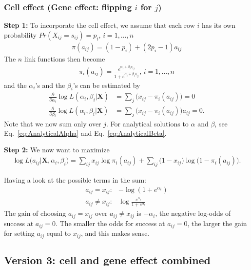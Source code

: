 \documentclass[12pt]{article}
\begin{document}
\subsubsection*{Cell effect {\small (Gene effect: flipping $i$ for $j$)}} %
{\bf Step 1:} To incorporate the cell effect, we assume that each row $i$ has its own probability  $Pr(X_{ij} = s_{ij}) = p_i, \, i = 1, \ldots , n$
\begin{align}
 \pi(a_{ij}) = (1 -  p_{i}) + (2  p_{i} - 1) a_{ij}
\end{align}
The $n$ link functions then become
\begin{align} \label{eq:LinkCell}
  \pi_i(a_{ij}) = \frac{e^{\alpha_{i} + \beta_{i} a_{ij}}}{1 + e^{\alpha_{i} + \beta_{i} a_{ij}}}, \, i = 1, \ldots, n
\end{align}
and the $\alpha_{i}$'s and the $\beta_{i}$'s can be estimated by
\begin{align}
  \frac{\partial}{\partial \alpha_i} \log L(\alpha_i, \beta_i|\mathbf{X}) &= \sum_{j} \big (x_{ij} -\pi_i(a_{ij}) \big ) = 0  \label{eq:iAlpha} \\
  \frac{\partial}{\partial \beta_i} \log L(\alpha_i, \beta_i|\mathbf{X}) &= \sum_{j}\big  (x_{ij} - \pi_i(a_{ij}) \big )a_{ij} = 0.  \label{eq:iBeta}
\end{align}
Note that we now sum only over $j$. 
For analytical solutions to $\alpha$ and $\beta$, see Eq.~\ref{eq:AnalyticalAlpha} and  Eq.~\ref{eq:AnalyticalBeta}.

{\bf Step 2:} We now want to maximize
\begin{align}
 \log L \big (a_{ij}|\mathbf{X}, \alpha_{i}, \beta_{i} \big ) =\sum_{i j}x_{ij} \log  \pi_i(a_{ij})+ \sum_{i j} \big (1 - x_{ij} \big)\log  \big ( 1 - \pi_i(a_{ij}) \big).
\end{align}

Having a look at the possible terms in the sum:
\begin{align} \label{eq:iLoglik_gain}
 a_{ij} = x_{ij} : & -\log(1 + e^{\alpha_{i}}) \\
 a_{ij} \neq x_{ij} : &\log \frac{e^{\alpha_{i}}}{1 + e^{\alpha_{i}}}\nonumber
\end{align}
The gain of choosing $a_{ij} = x_{ij}$ over $ a_{ij} \neq x_{ij}$ is $-\alpha_{i}$, the negative log-odds of success at $a_{ij} = 0$.
The smaller the odds for success at $a_{ij} = 0$, the larger the gain for setting $a_{ij}$ equal to $x_{ij}$, and this makes sense.

\subsection{ Version 3: cell and gene effect combined} %
\end{document}
